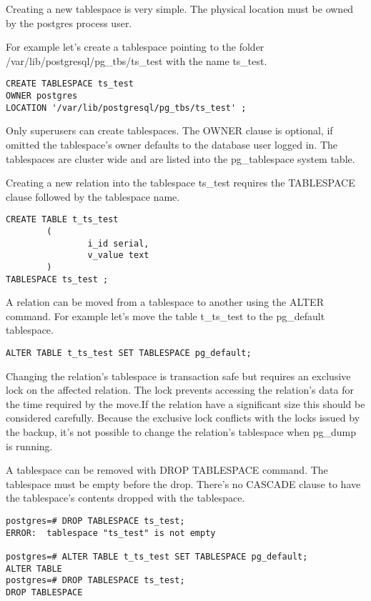 Creating a new tablespace is very simple. The physical location must be owned by the postgres
process user. 

For example let's create a tablespace pointing to the folder /var/lib/postgresql/pg\_tbs/ts\_test
with the name ts\_test.

\begin{lstlisting}[style=pgsql]
CREATE TABLESPACE ts_test 
OWNER postgres
LOCATION '/var/lib/postgresql/pg_tbs/ts_test' ;

\end{lstlisting}

Only superusers can create tablespaces. The OWNER clause is optional, if 
omitted the tablespace's owner defaults to the database user logged in. The tablespaces are cluster
wide and are listed into the pg\_tablespace system table.\newline

Creating a new relation into the tablespace ts\_test requires the TABLESPACE clause followed by the
tablespace name.

\begin{lstlisting}[style=pgsql]
CREATE TABLE t_ts_test
        (
                i_id serial,
                v_value text
        )
TABLESPACE ts_test ;

\end{lstlisting}

A relation can be moved from a tablespace to another using the ALTER command. For example let's
move the table t\_ts\_test to the  pg\_default tablespace.

\begin{lstlisting}[style=pgsql]
ALTER TABLE t_ts_test SET TABLESPACE pg_default;
\end{lstlisting}

Changing the relation's tablespace is transaction safe but requires an exclusive lock on the
affected relation. The lock prevents accessing the relation's data for the time required by the
move.If the relation have a significant size this should be considered carefully. Because the
exclusive lock conflicts with the locks issued by the backup, it's not possible to change the
relation's tablespace when pg\_dump is running.\newline


A tablespace can be removed with DROP TABLESPACE command. The tablespace must be empty before the
drop. There's no CASCADE clause to have the tablespace's contents dropped with the tablespace.

\begin{lstlisting}[style=pgsql]
postgres=# DROP TABLESPACE ts_test;
ERROR:  tablespace "ts_test" is not empty

postgres=# ALTER TABLE t_ts_test SET TABLESPACE pg_default;
ALTER TABLE
postgres=# DROP TABLESPACE ts_test;
DROP TABLESPACE

\end{lstlisting}


